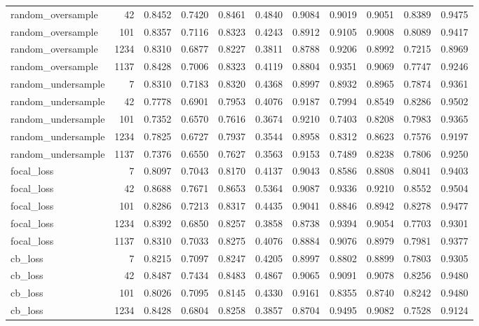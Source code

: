 \begin{table}
\begin{tabular}{lrrrrrrrrrr}
random\_oversample & 42 & 0.8452 & 0.7420 & 0.8461 & 0.4840 & 0.9084 & 0.9019 & 0.9051 & 0.8389 & 0.9475 \\
random\_oversample & 101 & 0.8357 & 0.7116 & 0.8323 & 0.4243 & 0.8912 & 0.9105 & 0.9008 & 0.8089 & 0.9417 \\
random\_oversample & 1234 & 0.8310 & 0.6877 & 0.8227 & 0.3811 & 0.8788 & 0.9206 & 0.8992 & 0.7215 & 0.8969 \\
random\_oversample & 1137 & 0.8428 & 0.7006 & 0.8323 & 0.4119 & 0.8804 & 0.9351 & 0.9069 & 0.7747 & 0.9246 \\
random\_undersample & 7 & 0.8310 & 0.7183 & 0.8320 & 0.4368 & 0.8997 & 0.8932 & 0.8965 & 0.7874 & 0.9361 \\
random\_undersample & 42 & 0.7778 & 0.6901 & 0.7953 & 0.4076 & 0.9187 & 0.7994 & 0.8549 & 0.8286 & 0.9502 \\
random\_undersample & 101 & 0.7352 & 0.6570 & 0.7616 & 0.3674 & 0.9210 & 0.7403 & 0.8208 & 0.7983 & 0.9365 \\
random\_undersample & 1234 & 0.7825 & 0.6727 & 0.7937 & 0.3544 & 0.8958 & 0.8312 & 0.8623 & 0.7576 & 0.9197 \\
random\_undersample & 1137 & 0.7376 & 0.6550 & 0.7627 & 0.3563 & 0.9153 & 0.7489 & 0.8238 & 0.7806 & 0.9250 \\
focal\_loss & 7 & 0.8097 & 0.7043 & 0.8170 & 0.4137 & 0.9043 & 0.8586 & 0.8808 & 0.8041 & 0.9403 \\
focal\_loss & 42 & 0.8688 & 0.7671 & 0.8653 & 0.5364 & 0.9087 & 0.9336 & 0.9210 & 0.8552 & 0.9504 \\
focal\_loss & 101 & 0.8286 & 0.7213 & 0.8317 & 0.4435 & 0.9041 & 0.8846 & 0.8942 & 0.8278 & 0.9477 \\
focal\_loss & 1234 & 0.8392 & 0.6850 & 0.8257 & 0.3858 & 0.8738 & 0.9394 & 0.9054 & 0.7703 & 0.9301 \\
focal\_loss & 1137 & 0.8310 & 0.7033 & 0.8275 & 0.4076 & 0.8884 & 0.9076 & 0.8979 & 0.7981 & 0.9377 \\
cb\_loss & 7 & 0.8215 & 0.7097 & 0.8247 & 0.4205 & 0.8997 & 0.8802 & 0.8899 & 0.7803 & 0.9305 \\
cb\_loss & 42 & 0.8487 & 0.7434 & 0.8483 & 0.4867 & 0.9065 & 0.9091 & 0.9078 & 0.8256 & 0.9480 \\
cb\_loss & 101 & 0.8026 & 0.7095 & 0.8145 & 0.4330 & 0.9161 & 0.8355 & 0.8740 & 0.8242 & 0.9480 \\
cb\_loss & 1234 & 0.8428 & 0.6804 & 0.8258 & 0.3857 & 0.8704 & 0.9495 & 0.9082 & 0.7528 & 0.9124 \\

\end{tabular}
\end{table}
